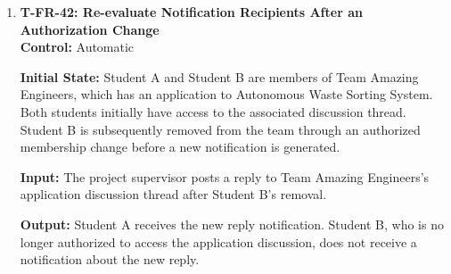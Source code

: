 \documentclass[12pt, titlepage]{article}
\begin{document}
\begin{enumerate}
\textbf{Control:} Automatic

\textbf{Initial State:} External Supervisor A owns Autonomous Waste Sorting System. External Supervisor B owns a different project and has no association with Supervisor A's project. Team Amazing Engineers has an application to Supervisor A's project. Supervisor B is not authorized to view that project or its application.

\textbf{Input:} Supervisor A accepts Team Amazing Engineers's application.

\textbf{Output:} Authorized recipients associated with the application receive the relevant email notification. Supervisor B receives no notification about Supervisor A's project, and no project information is exposed to Supervisor B.

\textbf{Test Case Derivation:} Derived from \texttt{FR\_ThreadsNotify} and \texttt{FR\_ExternalSupervisorScope}. Notification recipients must be determined according to their authorization at the time of sending. The test verifies that project confidentiality is maintained through email notifications.

\textbf{How Test Will Be Performed:}
Configure both supervisors and Team Amazing Engineers's application. Using Playwright, trigger the acceptance decision. Inspect the outgoing email records and verify that only authorized recipients receive project-related notifications. Confirm that Supervisor B's was not sent any messages related to the event.

\item \label{T-FR-42}\textbf{T-FR-42: Re-evaluate Notification Recipients After an Authorization Change}\\

\textbf{Control:} Automatic

\textbf{Initial State:} Student A and Student B are members of Team Amazing Engineers, which has an application to Autonomous Waste Sorting System. Both students initially have access to the associated discussion thread. Student B is subsequently removed from the team through an authorized membership change before a new notification is generated.

\textbf{Input:} The project supervisor posts a reply to Team Amazing Engineers's application discussion thread after Student B's removal.

\textbf{Output:} Student A receives the new reply notification. Student B, who is no longer authorized to access the application discussion, does not receive a notification about the new reply.


\end{enumerate}
\end{document}
